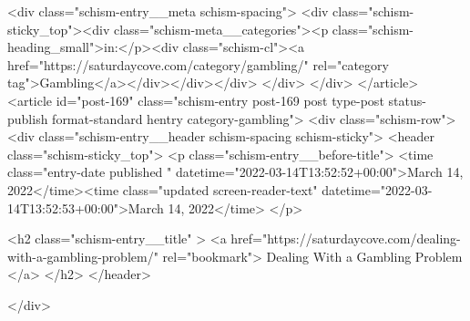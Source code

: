 {		<div class="schism-entry__meta schism-spacing">			<div class="schism-sticky_top"><div class="schism-meta__categories"><p class="schism-heading_small">in:</p><div class="schism-cl"><a href="https://saturdaycove.com/category/gambling/" rel="category tag">Gambling</a></div></div></div>		</div>
	</div>
</article>
<article id="post-169" class="schism-entry post-169 post type-post status-publish format-standard hentry category-gambling">
	<div class="schism-row">		<div class="schism-entry__header schism-spacing schism-sticky">			<header class="schism-sticky_top">				<p class="schism-entry__before-title">
					<time class="entry-date published " datetime="2022-03-14T13:52:52+00:00">March 14, 2022</time><time class="updated screen-reader-text" datetime="2022-03-14T13:52:53+00:00">March 14, 2022</time>				</p>

				<h2 class="schism-entry__title" >
					<a href="https://saturdaycove.com/dealing-with-a-gambling-problem/" rel="bookmark">
						Dealing With a Gambling Problem					</a>
				</h2>
			</header>

					</div>

}
